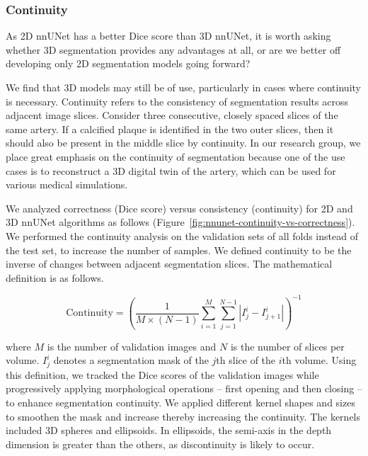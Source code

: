 \documentclass[a4paper,11pt,oneside]{report}
\begin{document}
\subsubsection{Continuity}
As 2D nnUNet has a better Dice score than 3D nnUNet, it is worth asking whether 3D segmentation provides any advantages at all, or are we better off developing only 2D segmentation models going forward?

We find that 3D models may still be of use, particularly in cases where continuity is necessary. Continuity refers to the consistency of segmentation results across adjacent image slices. Consider three consecutive, closely spaced slices of the same artery. If a calcified plaque is identified in the two outer slices, then it should also be present in the middle slice by continuity. In our research group, we place great emphasis on the continuity of segmentation because one of the use cases is to reconstruct a 3D digital twin of the artery, which can be used for various medical simulations. 

We analyzed correctness (Dice score) versus consistency (continuity) for 2D and 3D nnUNet algorithms as follows (Figure~\ref{fig:nnunet-continuity-vs-correctness}). We performed the continuity analysis on the validation sets of all folds instead of the test set, to increase the number of samples. We defined continuity to be the inverse of changes between adjacent segmentation slices. The mathematical definition is as follows.

\begin{equation}
\text{Continuity} = \left(\frac{1}{M\times (N - 1)}\sum_{i = 1}^{M}\sum_{j = 1}^{N-1} \left| I_{j}^{i} - I_{j+1}^{i}\right|\right)^{-1}
\end{equation}

where $M$ is the number of validation images and $N$ is the number of slices per volume. $I_{j}^{i}$ denotes a segmentation mask of the $j$th slice of the $i$th volume. Using this definition, we tracked the Dice scores of the validation images while progressively applying morphological operations -- first opening and then closing -- to enhance segmentation continuity. We applied different kernel shapes and sizes to smoothen the mask and increase thereby increasing the continuity. The kernels included 3D spheres and ellipsoids. In ellipsoids, the semi-axis in the depth dimension is greater than the others, as discontinuity is likely to occur. 
\end{document}

